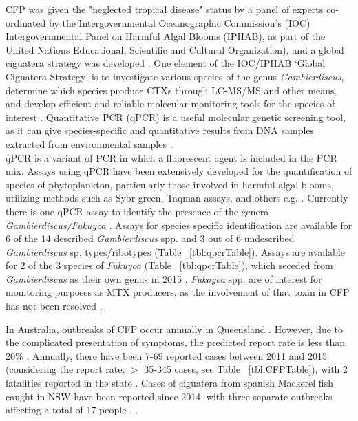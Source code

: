 \documentclass[12pt]{article}
\begin{document}
CFP was given the "neglected tropical disease" status by a panel of experts co-ordinated by the Intergovernmental Oceanographic Commission’s (IOC) Intergovernmental Panel on Harmful Algal Blooms (IPHAB), as part of the United Nations Educational, Scientific and Cultural Organization), and a global ciguatera strategy was developed \citep{globalcig}. 
One element of the IOC/IPHAB ‘Global Ciguatera Strategy’ is to  investigate various species of the genus \emph{Gambierdiscus}, determine which species produce CTXs through LC-MS/MS and other means, and develop efficient and reliable molecular monitoring tools for the species of interest \citep{globalcig}. Quantitative PCR (qPCR) is a useful molecular genetic screening tool, as it can give species-specific and quantitative results from DNA samples extracted from environmental samples \citep{globalcig}. \\

qPCR is a variant of PCR in which a fluorescent agent is included in the PCR mix. Assays using qPCR have been extensively developed for the quantification of species of phytoplankton, particularly those involved in harmful algal blooms, utilizing methods such as Sybr green, Taqman assays, and others e.g. \citep{murray2011sxta,antonella2013quantitative,smith2009advantages,nishimura2016quantitative,vandersea2012development,hariganeya2013quantitative}. %
\FloatBarrier
Currently there is one qPCR assay to identify the presence of the genera \emph{Gambierdiscus/Fukuyoa} \citep{smith2017molecular}. Assays for species specific identification are available for 6 of the 14 described \emph{Gambierdiscus} spp. and 3 out of 6 undescribed \emph{Gambierdiscus} sp. types/ribotypes (Table ~\ref{tbl:qpcrTable}). Assays are available for 2 of the 3 species of \emph{Fukuyoa} (Table ~\ref{tbl:qpcrTable}), which seceded from \emph{Gambierdiscus} as their own genus in 2015 \citep{gomez2015fukuyoa}. \textit{Fukoyoa} spp. are of interest for monitoring purposes as MTX producers, as the involvement of that toxin in CFP has not been resolved \citep{kohli2014feeding}.


In Australia, outbreaks of CFP occur annually in Queensland \citep{qldcig}. However, due to the complicated presentation of symptoms, the predicted report rate is less than 20\% \citep{lewis2006ciguatera}. Annually, there have been 7-69 reported cases between 2011 and 2015 (considering the report rate, $>$ 35-345 cases, see Table ~\ref{tbl:CFPTable}), with 2 fatalities reported in the state \citep{tonge1967ciguatera}. Cases of ciguatera from spanish Mackerel fish caught in NSW have been reported since 2014, with three separate outbreaks affecting a total of 17 people \citep{farrellclinical}.
. %
\end{document}
